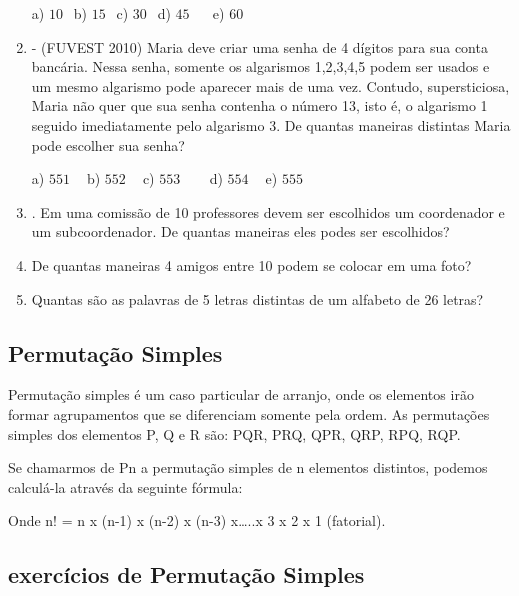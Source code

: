 \begin{multicols*}{2}
\begin{enumerate}
		      a) $10 \ \ $ b) $15 \ \ $ c) $30 \ \ $ d) $45 \ \ \ \ \ \ $ e) $60 \ \ $

		\item - (FUVEST 2010) Maria deve criar uma senha de 4 dígitos para sua conta bancária.
		      Nessa senha, somente os algarismos 1,2,3,4,5 podem ser usados e um mesmo algarismo pode
		      aparecer mais de uma vez. Contudo, supersticiosa, Maria não quer que sua senha contenha o
		      número 13, isto é, o algarismo 1 seguido imediatamente pelo algarismo 3. De quantas maneiras
		      distintas Maria pode escolher sua senha?

		      a) $551 \ \ \ \ $ b) $552 \ \ \ \ $ c) $553 \ \ \ \ \ \ \ \ $ d) $554 \ \ \ \ $ e) $555 \ \ $

		\item . Em uma comissão de 10 professores devem ser escolhidos um coordenador e um subcoordenador. De quantas maneiras eles podes ser escolhidos?

		\item De quantas maneiras 4 amigos entre 10 podem se colocar em uma foto?

		\item Quantas são as palavras de 5 letras distintas de um alfabeto de 26 letras?

	\end{enumerate}

	\subsection{Permutação Simples}

	Permutação simples é um caso particular de arranjo, onde os elementos irão formar agrupamentos que se diferenciam somente pela ordem. As permutações simples dos elementos P, Q e R são: PQR, PRQ, QPR, QRP, RPQ, RQP.

	Se chamarmos de Pn a permutação simples de n elementos distintos, podemos calculá-la através da seguinte fórmula:


	Onde n! = n x (n-1) x (n-2)  x (n-3) x…..x 3 x 2 x 1 (fatorial).

	\subsection{exercícios de Permutação Simples}

	\begin{enumerate}


\end{enumerate}
\end{multicols*}
